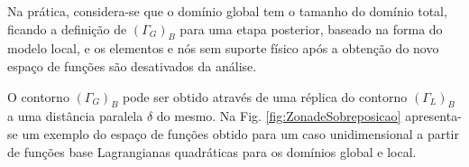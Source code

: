 \documentclass[tese_patricia]{subfiles}
\begin{document}
Na pr\'atica, considera-se que o dom\'inio global tem o tamanho do dom\'inio total, ficando a defini\c{c}\~ao de $(\Gamma_{G})_{B}$ para uma etapa posterior, baseado na forma do modelo local, e os elementos e n\'os sem suporte f\'isico ap\'os a obten\c{c}\~ao do novo espa\c{c}o de fun\c{c}\~oes s\~ao desativados da an\'alise.

O contorno $(\Gamma_{G})_{B}$ pode ser obtido atrav\'es de uma r\'eplica do contorno $(\Gamma_{L})_{B}$ a uma dist\^ancia paralela $\delta$ do mesmo.  Na Fig. \ref{fig:ZonadeSobreposicao} apresenta-se um exemplo do espaço de funções obtido para um caso unidimensional a partir de funções base Lagrangianas quadráticas para os domínios global e local.


\begin{figure}[!htb]
	\centering
	 \\
	 \\

\end{figure}
\end{document}
